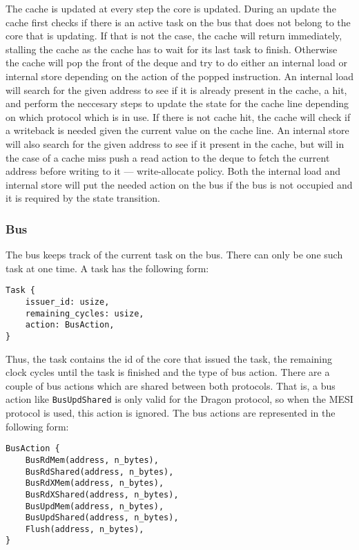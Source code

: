 The cache is updated at every step the core is updated.  During an update the cache first checks if
there is an active task on the bus that does not belong to the core that is updating.  If that is
not the case, the cache will return immediately, stalling the cache as the cache has to wait for its
last task to finish.  Otherwise the cache will pop the front of the deque and try to do either an
internal load or internal store depending on the action of the popped instruction.  An internal load
will search for the given address to see if it is already present in the cache, a hit, and perform
the neccesary steps to update the state for the cache line depending on which protocol which is in
use.  If there is not cache hit, the cache will check if a writeback is needed given the current
value on the cache line.  An internal store will also search for the given address to see if it
present in the cache, but will in the case of a cache miss push a read action to the deque to fetch
the current address before writing to it --- write-allocate policy.  Both the internal load and
internal store will put the needed action on the bus if the bus is not occupied and it is required
by the state transition.


\subsubsection{Bus}

The bus keeps track of the current task on the bus. There can only be one such task at one time. A
task has the following form:

\begin{lstlisting}
Task {
    issuer_id: usize,
    remaining_cycles: usize,
    action: BusAction,
}
\end{lstlisting}

Thus, the task contains the id of the core that issued the task, the remaining clock cycles until
the task is finished and the type of bus action.  There are a couple of bus actions which are shared
between both protocols.  That is, a bus action like \texttt{BusUpdShared} is only valid for the
Dragon protocol, so when the MESI protocol is used, this action is ignored.  The bus actions are
represented in the following form:

\begin{lstlisting}
BusAction {
    BusRdMem(address, n_bytes),
    BusRdShared(address, n_bytes),
    BusRdXMem(address, n_bytes),
    BusRdXShared(address, n_bytes),
    BusUpdMem(address, n_bytes),
    BusUpdShared(address, n_bytes),
    Flush(address, n_bytes),
}
\end{lstlisting}

